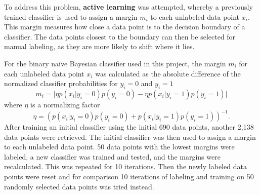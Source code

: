 \documentclass[12pt]{article}
\begin{document}
To address this problem, \textbf{active learning} was attempted, whereby a previously trained classifier is used to assign a margin $m_i$ to each unlabeled data point $x_i$. This margin measures how close a data point is to the decision boundary of a classifier. The data points closest to the boundary can then be selected for manual labeling, as they are more likely to shift where it lies.

For the binary naive Bayesian classifier used in this project, the margin $m_i$ for each unlabeled data point $x_i$ was calculated as the absolute difference of the normalized classifier probabilities for $y_i=0$ and $y_i=1$
\[
	m_i = \lvert \eta p\left(x_i \vert y_i=0\right)p\left(y_i=0\right) - \eta p\left(x_i \vert y_i=1\right)p\left(y_i=1\right)\rvert
\]
\noindent where $\eta$ is a normalizing factor
\[
	\eta = \left(p\left(x_i \vert y_i=0\right)p\left(y_i=0\right) + p\left(x_i \vert y_i=1\right)p\left(y_i=1\right)\right)^{-1}.
\]
	After training an initial classifier using the initial 690 data points, another 2,138 data points were retrieved. The initial classifier was then used to assign a margin to each unlabeled data point. 50 data points with the lowest margins were labeled, a new classifier was trained and tested, and the margins were recalculated. This was repeated for 10 iterations. Then the newly labeled data points were reset and for comparison 10 iterations of labeling and training on 50 randomly selected data points was tried instead.
\end{document}
